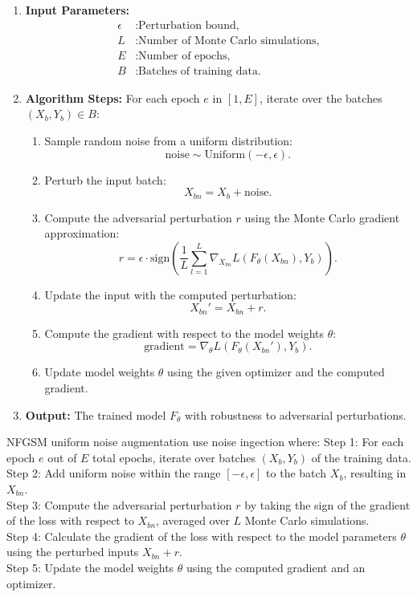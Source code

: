 \begin{enumerate}
    \item \textbf{Input Parameters:}
    \begin{align*}
    \epsilon &: \text{Perturbation bound,} \\
    L &: \text{Number of Monte Carlo simulations,} \\
    E &: \text{Number of epochs,} \\
    B &: \text{Batches of training data.}
    \end{align*}

    \item \textbf{Algorithm Steps:}
    For each epoch $e$ in $[1, E]$, iterate over the batches $(X_b, Y_b) \in B$:
    \begin{enumerate}
        \item Sample random noise from a uniform distribution:
        \[
        \text{noise} \sim \text{Uniform}(-\epsilon, \epsilon).
        \]
        \item Perturb the input batch:
        \[
        X_{bn} = X_b + \text{noise}.
        \]
        \item Compute the adversarial perturbation $r$ using the Monte Carlo gradient approximation:
        \[
        r = \epsilon \cdot \text{sign}\left( \frac{1}{L} \sum_{l=1}^L \nabla_{X_{bn}} L(F_\theta(X_{bn}), Y_b) \right).
        \]
        \item Update the input with the computed perturbation:
        \[
        X_{bn}' = X_{bn} + r.
        \]
        \item Compute the gradient with respect to the model weights $\theta$:
        \[
        \text{gradient} = \nabla_{\theta} L(F_\theta(X_{bn}'), Y_b).
        \]
        \item Update model weights $\theta$ using the given optimizer and the computed gradient.
    \end{enumerate}

    \item \textbf{Output:} The trained model $F_\theta$ with robustness to adversarial perturbations.
\end{enumerate}


NFGSM uniform noise augmentation use noise ingection where:
Step 1: For each epoch $e$ out of $E$ total epochs, iterate over batches $(X_b, Y_b)$ of the training data. \\
Step 2: Add uniform noise within the range $[- \epsilon, \epsilon]$ to the batch $X_b$, resulting in $X_{bn}$.\\
Step 3: Compute the adversarial perturbation $r$ by taking the sign of the gradient of the loss with respect to $X_{bn}$, averaged over $L$ Monte Carlo simulations. \\
Step 4: Calculate the gradient of the loss with respect to the model parameters $\theta$ using the perturbed inputs $X_{bn} + r$. \\
Step 5: Update the model weights $\theta$ using the computed gradient and an optimizer.
